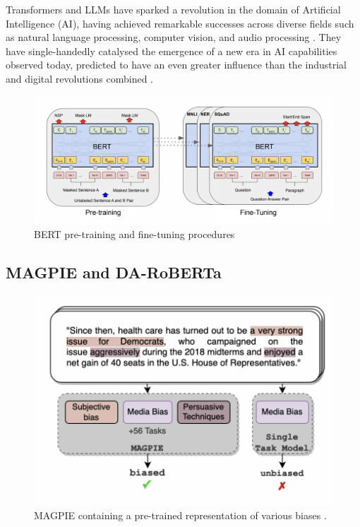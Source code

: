 Transformers and LLMs have sparked a revolution in the domain of Artificial Intelligence (AI), having achieved remarkable successes across diverse fields such as natural language processing, computer vision, and audio processing \cite{lin-2022-survey-transformers}. They have single-handedly catalysed the emergence of a new era in AI capabilities observed today, predicted to have an even greater influence than the industrial and digital revolutions combined \cite{makridakis-2017-ai-revolution}.

\begin{figure}[htbp]
    \centering
    \includegraphics[width=0.9\linewidth]{images/bert_finetuning.png}
    \caption{BERT pre-training and fine-tuning procedures \cite{devlin-2019-bert}}
    \label{fig:bert_finetuning}
\end{figure}


\subsection{MAGPIE and DA-RoBERTa}

\begin{figure}[htbp]
    \centering
    \includegraphics[width=0.7\linewidth]{images/magpie.png}
    \caption{MAGPIE containing a pre-trained representation of various biases \cite{horych-2024-magpie}.}
    \label{fig:magpie}
\end{figure}


